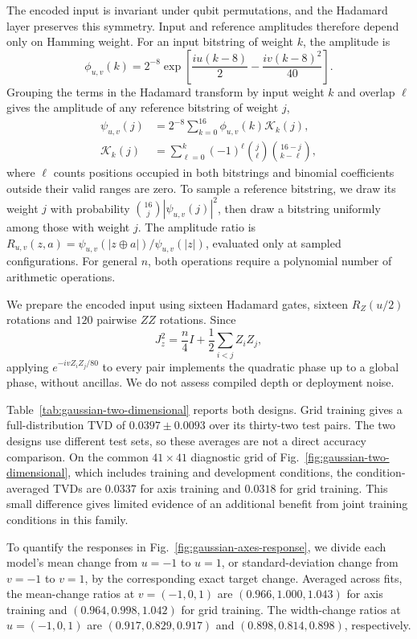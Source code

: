 \documentclass[pra,aps,10pt,twocolumn,floatfix,superscriptaddress, notitlepage,longbibliography]{revtex4-2}
\begin{document}
The encoded input is invariant under qubit permutations, and the Hadamard layer preserves this symmetry. Input and reference amplitudes therefore depend only on Hamming weight. For an input bitstring of weight $k$, the amplitude is
\begin{equation}
 \phi_{u,v}(k)=2^{-8}\exp\!\left[\frac{iu(k-8)}2
                       -\frac{iv(k-8)^2}{40}\right].
\end{equation}
Grouping the terms in the Hadamard transform by input weight $k$ and overlap $\ell$ gives the amplitude of any reference bitstring of weight $j$,
\begin{align}
 \psi_{u,v}(j)&=2^{-8}\sum_{k=0}^{16}\phi_{u,v}(k)\mathcal K_k(j),\\
 \mathcal K_k(j)&=\sum_{\ell=0}^{k}(-1)^\ell
              \binom{j}{\ell}\binom{16-j}{k-\ell},
\end{align}
where $\ell$ counts positions occupied in both bitstrings and binomial coefficients outside their valid ranges are zero. To sample a reference bitstring, we draw its weight $j$ with probability $\binom{16}{j}|\psi_{u,v}(j)|^2$, then draw a bitstring uniformly among those with weight $j$. The amplitude ratio is $R_{u,v}(z,a)=\psi_{u,v}(|z\oplus a|)/\psi_{u,v}(|z|)$, evaluated only at sampled configurations. For general $n$, both operations require a polynomial number of arithmetic operations.

We prepare the encoded input using sixteen Hadamard gates, sixteen $R_Z(u/2)$ rotations and $120$ pairwise $ZZ$ rotations. Since
\[
 J_z^2=\frac n4I+\frac12\sum_{i<j}Z_iZ_j,
\]
applying $e^{-ivZ_iZ_j/80}$ to every pair implements the quadratic phase up to a global phase, without ancillas. We do not assess compiled depth or deployment noise.



Table~\ref{tab:gaussian-two-dimensional} reports both designs. Grid training gives a full-distribution TVD of $0.0397\pm0.0093$ over its thirty-two test pairs. The two designs use different test sets, so these averages are not a direct accuracy comparison. On the common $41\times41$ diagnostic grid of Fig.~\ref{fig:gaussian-two-dimensional}, which includes training and development conditions, the condition-averaged TVDs are $0.0337$ for axis training and $0.0318$ for grid training. This small difference gives limited evidence of an additional benefit from joint training conditions in this family.

To quantify the responses in Fig.~\ref{fig:gaussian-axes-response}, we divide each model's mean change from $u=-1$ to $u=1$, or standard-deviation change from $v=-1$ to $v=1$, by the corresponding exact target change. Averaged across fits, the mean-change ratios at $v=(-1,0,1)$ are $(0.966,1.000,1.043)$ for axis training and $(0.964,0.998,1.042)$ for grid training. The width-change ratios at $u=(-1,0,1)$ are $(0.917,0.829,0.917)$ and $(0.898,0.814,0.898)$, respectively.
\end{document}
